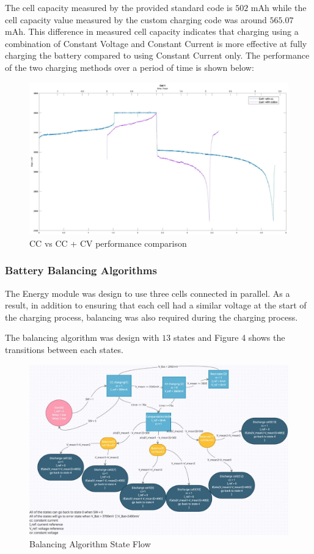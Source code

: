 \documentclass[11pt, a4paper]{article}
\begin{document}
The cell capacity measured by the provided standard code is $502$ mAh while the cell capacity value measured by the custom charging code was around $565.07$ mAh. This difference in measured cell capacity indicates that charging using a combination of Constant Voltage and Constant Current is more effective at fully charging the battery compared to using Constant Current only. The performance of the two charging methods over a period of time is shown below:
\begin{figure} [h!]
    \centering
    \includegraphics[scale=0.5]{CC and CV.JPG}
    \caption{CC vs CC + CV performance comparison}
\end{figure} 

\pagebreak

\subsubsection{Battery Balancing Algorithms}

The Energy module was design to use three cells connected in parallel. As a result, in addition to ensuring that each cell had a similar voltage at the start of the charging process, balancing was also required during the charging process. 

The balancing algorithm was design with $13$ states and Figure 4 shows the transitions between each states.    

\begin{figure} [h!]
    \centering
    \includegraphics[scale=0.65]{Energy_state.JPG}
    \caption{Balancing Algorithm State Flow}
    \label{fig:State}
\end{figure}
\end{document}

